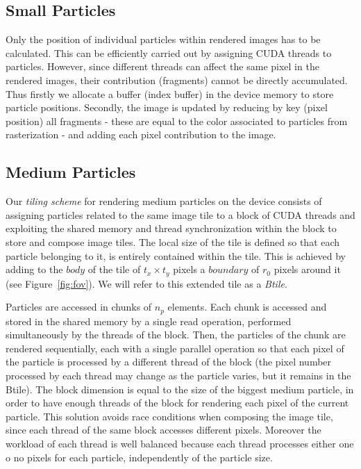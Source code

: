 \documentclass[1p]{elsarticle}
\begin{document}
\subsection{Small Particles}
\label{sec:smallparticles}
Only the position of individual particles within rendered images has to be calculated. This can be efficiently carried out by assigning CUDA threads to particles. However, since different threads can affect the same pixel in the rendered images, their contribution (fragments) cannot be directly accumulated. Thus firstly we allocate a buffer (index buffer) in the device memory to store particle positions. Secondly, the image is updated by reducing by key (pixel position) all fragments - these are equal to the color associated to particles from rasterization - and adding each pixel contribution to the image.

\subsection{Medium Particles}
\label{sec:mediumparticles}
Our \textit{tiling scheme} for rendering medium particles on the device consists of assigning particles related to the same image tile to a block of CUDA threads and exploiting the shared memory and thread synchronization within the block to store and compose image tiles. The local size of the tile is defined so that each particle belonging to it, is entirely contained within the tile. This is achieved by adding to the $body$ of the tile of $t_x \times t_y$ pixels a $boundary$ of $r_0$ pixels around it (see Figure~\ref{fig:fov}). We will refer to this extended tile as a \textit{Btile}.

Particles are accessed in chunks of $n_p$ elements. Each chunk is accessed and stored in the shared memory by a single read operation, performed simultaneously by the threads of the block. Then, the particles of the chunk are rendered sequentially, each with a single parallel operation so that each pixel of the particle is processed by a different thread of the block (the pixel number processed by each thread may change as the particle varies, but it remains in the Btile). The block dimension is equal to the size of the biggest medium particle, in order to have enough threads of the block for rendering each pixel of the current particle. 
This solution avoids race conditions when composing the image tile, since each
thread of the same block accesses different pixels. Moreover the workload of each
thread is well balanced because each thread processes either one o no pixels for each particle, independently of the particle size. 
\end{document}
